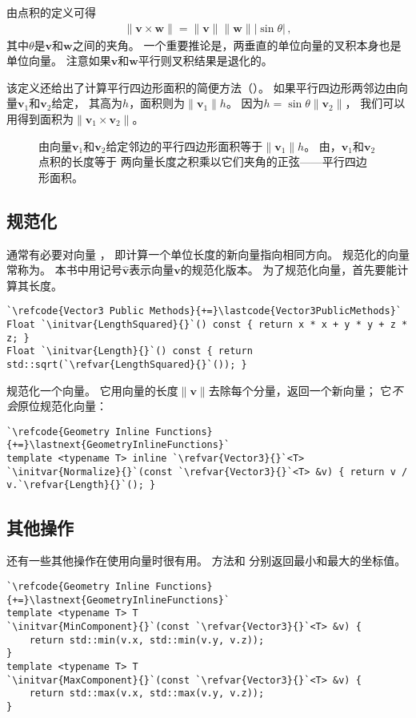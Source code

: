 由点积的定义可得
\begin{align}\label{eq:2.2}
    \|\bm v\times\bm w\|=\|\bm v\|\|\bm w\||\sin\theta|\, ,
\end{align}
其中$\theta$是$\bm v$和$\bm w$之间的夹角。
一个重要推论是，两垂直的单位向量的叉积本身也是单位向量。
注意如果$\bm v$和$\bm w$平行则叉积结果是退化的。

该定义还给出了计算平行四边形面积的简便方法（）。
如果平行四边形两邻边由向量$\bm v_1$和$\bm v_2$给定，
其高为$h$，面积则为$\|\bm v_1\|h$。
因为$h=\sin\theta\|\bm v_2\|$，
我们可以用得到面积为$\|\bm v_1\times\bm v_2\|$。
\begin{figure}[htbp]
    \centering
    \caption{由向量$\bm v_1$和$\bm v_2$给定邻边的平行四边形面积等于$\|\bm v_1\|h$。
        由\protect{}，$\bm v_1$和$\bm v_2$点积的长度等于
        两向量长度之积乘以它们夹角的正弦——平行四边形面积。}
    \label{fig:2.5}
\end{figure}

\subsection{规范化}\label{sub:规范化}
通常有必要对向量
，
即计算一个单位长度的新向量指向相同方向。
规范化的向量常称为。
本书中用记号$\hat{\bm v}$表示向量$\bm v$的规范化版本。
为了规范化向量，首先要能计算其长度。
\begin{lstlisting}
`\refcode{Vector3 Public Methods}{+=}\lastcode{Vector3PublicMethods}`
Float `\initvar{LengthSquared}{}`() const { return x * x + y * y + z * z; }
Float `\initvar{Length}{}`() const { return std::sqrt(`\refvar{LengthSquared}{}`()); }
\end{lstlisting}

规范化一个向量。
它用向量的长度$\|\bm v\|$去除每个分量，返回一个新向量；
它\emph{不会}原位规范化向量：
\begin{lstlisting}
`\refcode{Geometry Inline Functions}{+=}\lastnext{GeometryInlineFunctions}`
template <typename T> inline `\refvar{Vector3}{}`<T>
`\initvar{Normalize}{}`(const `\refvar{Vector3}{}`<T> &v) { return v / v.`\refvar{Length}{}`(); }
\end{lstlisting}

\subsection{其他操作}\label{sub:其他操作}
还有一些其他操作在使用向量时很有用。
方法和
分别返回最小和最大的坐标值。
\begin{lstlisting}
`\refcode{Geometry Inline Functions}{+=}\lastnext{GeometryInlineFunctions}`
template <typename T> T
`\initvar{MinComponent}{}`(const `\refvar{Vector3}{}`<T> &v) {
    return std::min(v.x, std::min(v.y, v.z));
}
template <typename T> T
`\initvar{MaxComponent}{}`(const `\refvar{Vector3}{}`<T> &v) {
    return std::max(v.x, std::max(v.y, v.z));
}
\end{lstlisting}

